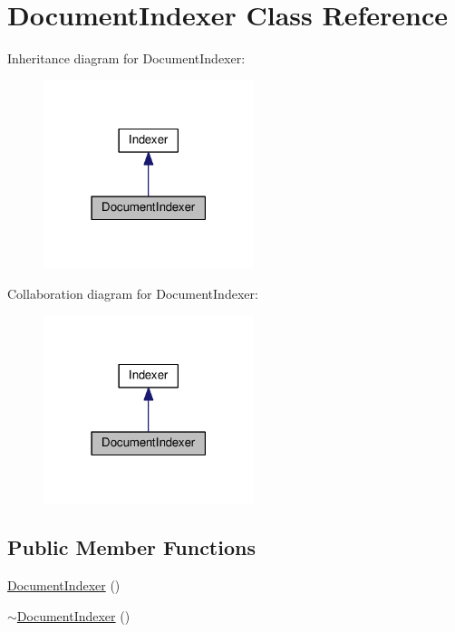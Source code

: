\hypertarget{classDocumentIndexer}{}\section{Document\+Indexer Class Reference}
\label{classDocumentIndexer}


Inheritance diagram for Document\+Indexer\+:\nopagebreak
\begin{figure}[H]
\begin{center}
\leavevmode
\includegraphics[width=174pt]{classDocumentIndexer__inherit__graph}
\end{center}
\end{figure}


Collaboration diagram for Document\+Indexer\+:\nopagebreak
\begin{figure}[H]
\begin{center}
\leavevmode
\includegraphics[width=174pt]{classDocumentIndexer__coll__graph}
\end{center}
\end{figure}
\subsection*{Public Member Functions}
\begin{DoxyCompactItemize}
\item 
\hyperlink{classDocumentIndexer_a44f3c39ee50c32c0226fe98a66f71d07}{Document\+Indexer} ()
\item 
\hyperlink{classDocumentIndexer_aa3b39750a5477caa4aeab84f1c690c20}{$\sim$\+Document\+Indexer} ()
\end{DoxyCompactItemize}
